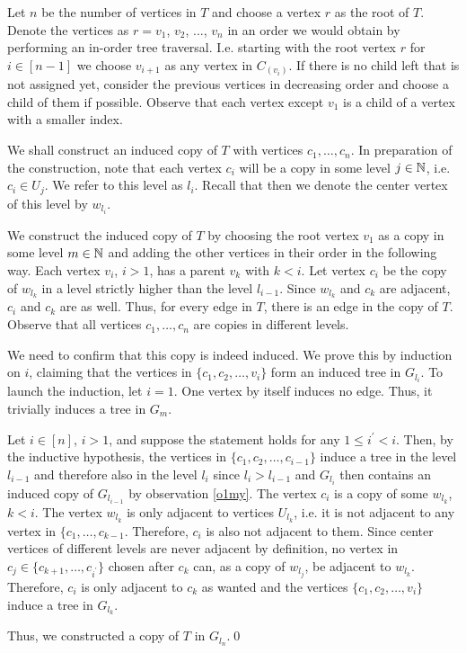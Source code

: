 \begin{prf}
Let $n$ be the number of vertices in $T$ and choose a vertex $r$ as the root of $T$. Denote the vertices as $r=v_1$, $v_2$, ..., $v_n$ in an order we would obtain by performing an in-order tree traversal. I.e. starting with the root vertex $r$ for $i\in [n-1]$ we choose $v_{i+1}$ as any vertex in $C_(v_i)$. If there is no child left that is not assigned yet, consider the previous vertices in decreasing order and choose a child of them if possible. Observe that each vertex except $v_1$ is a child of a vertex with a smaller index.

We shall construct an induced copy of $T$ with vertices $c_1,\dots ,c_n$. 
In preparation of the construction, note that each vertex $c_i$ will be a copy in some level $j\in\mathbb{N}$, i.e. $c_i\in U_j$. We refer to this level as $l_i$. Recall that then we denote the center vertex of this level by $w_{l_i}$.

We construct the induced copy of $T$ by choosing the root vertex $v_1$ as a copy in some level $m\in\mathbb{N}$ and adding the other vertices in their order in the following way. Each vertex $v_i$, $i>1$, has a parent $v_k$ with $k<i$. Let vertex $c_i$ be the copy of $w_{l_k}$ in a level strictly higher than the level  $l_{i-1}$. Since $w_{l_k}$ and $c_k$ are adjacent, $c_i$ and $c_k$ are as well. Thus, for every edge in $T$, there is an edge in the copy of $T$. Observe that all vertices $c_1,\dots , c_n$ are copies in different levels. 

We need to confirm that this copy is indeed induced. We prove this by induction on $i$, claiming that the vertices in $\lbrace c_1, c_2, \dots , v_i\rbrace$ form an induced tree in $G_{l_i}$. To launch the induction, let $i=1$. One vertex by itself induces no edge. Thus, it trivially induces a tree in $G_m$.

Let $i\in [n]$, $i>1$, and suppose the statement holds for any $1\leq i^\prime < i$. Then, by the inductive hypothesis, the vertices in $\lbrace c_1, c_2, \dots , c_{i-1}\rbrace$ induce a tree in the level $l_{i-1}$ and therefore also in the level $l_i$ since $l_i >l_{i-1}$ and $G_{l_i}$ then contains an induced copy of $G_{l_{i-1}}$ by observation \ref{o1my}. The vertex $c_i$ is a copy of some $w_{l_k}$, $k<i$. The vertex $w_{l_k}$ is only adjacent to vertices $U_{l_k}$, i.e. it is not adjacent to any vertex in $\lbrace c_1, \dots , c_{k-1}$. Therefore, $c_i$ is also not adjacent to them. Since center vertices of different levels are never adjacent by definition, no vertex in $c_j\in\lbrace c_{k+1}, \dots ,c_{i^\prime}\rbrace$ chosen after $c_k$ can, as a copy of $w_{l_j}$, be adjacent to $w_{l_k}$. Therefore, $c_i$ is only adjacent to $c_k$ as wanted and the vertices $\lbrace c_1, c_2, \dots , v_i\rbrace$ induce a tree in $G_{l_k}$.

Thus, we constructed a copy of $T$ in $G_{l_n}$.\qed
\end{prf}
